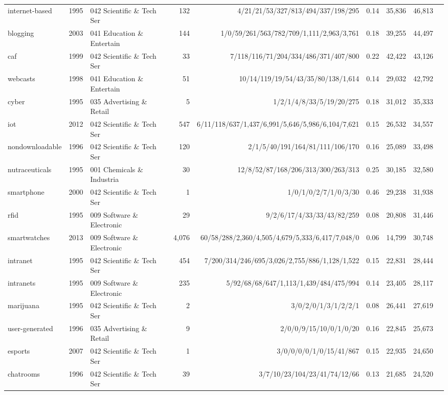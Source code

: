 {\begin{tabular}{llp{3.2cm}rrp{3.4cm}rrr}
internet-based & 1995 & 042 Scientific \& Tech Ser & 132 & 4/21/21/53/327/813/494/337/198/295 & 0.14 & 35,836 & 46,813 \\
blogging & 2003 & 041 Education \& Entertain & 144 & 1/0/59/261/563/782/709/1,111/2,963/3,761 & 0.18 & 39,255 & 44,497 \\
caf & 1999 & 042 Scientific \& Tech Ser & 33 & 7/118/116/71/204/334/486/371/407/800 & 0.22 & 42,422 & 43,126 \\
webcasts & 1998 & 041 Education \& Entertain & 51 & 10/14/119/19/54/43/35/80/138/1,614 & 0.14 & 29,032 & 42,792 \\
cyber & 1995 & 035 Advertising \& Retail & 5 & 1/2/1/4/8/33/5/19/20/275 & 0.18 & 31,012 & 35,333 \\
iot & 2012 & 042 Scientific \& Tech Ser & 547 & 6/11/118/637/1,437/6,991/5,646/5,986/6,104/7,621 & 0.15 & 26,532 & 34,557 \\
nondownloadable & 1996 & 042 Scientific \& Tech Ser & 120 & 2/1/5/40/191/164/81/111/106/170 & 0.16 & 25,089 & 33,498 \\
nutraceuticals & 1995 & 001 Chemicals \& Industria & 30 & 12/8/52/87/168/206/313/300/263/313 & 0.25 & 30,185 & 32,580 \\
smartphone & 2000 & 042 Scientific \& Tech Ser & 1 & 1/0/1/0/2/7/1/0/3/30 & 0.46 & 29,238 & 31,938 \\
rfid & 1995 & 009 Software \& Electronic & 29 & 9/2/6/17/4/33/33/43/82/259 & 0.08 & 20,808 & 31,446 \\
smartwatches & 2013 & 009 Software \& Electronic & 4,076 & 60/58/288/2,360/4,505/4,679/5,333/6,417/7,048/0 & 0.06 & 14,799 & 30,748 \\
intranet & 1995 & 042 Scientific \& Tech Ser & 454 & 7/200/314/246/695/3,026/2,755/886/1,128/1,522 & 0.15 & 22,831 & 28,444 \\
intranets & 1995 & 009 Software \& Electronic & 235 & 5/92/68/68/647/1,113/1,439/484/475/994 & 0.14 & 23,405 & 28,117 \\
marijuana & 1995 & 042 Scientific \& Tech Ser & 2 & 3/0/2/0/1/3/1/2/2/1 & 0.08 & 26,441 & 27,619 \\
user-generated & 1996 & 035 Advertising \& Retail & 9 & 2/0/0/9/15/10/0/1/0/20 & 0.16 & 22,845 & 25,673 \\
esports & 2007 & 042 Scientific \& Tech Ser & 1 & 3/0/0/0/0/1/0/15/41/867 & 0.15 & 22,935 & 24,650 \\
chatrooms & 1996 & 042 Scientific \& Tech Ser & 39 & 3/7/10/23/104/23/41/74/12/66 & 0.13 & 21,685 & 24,520 \\

\end{tabular}}
